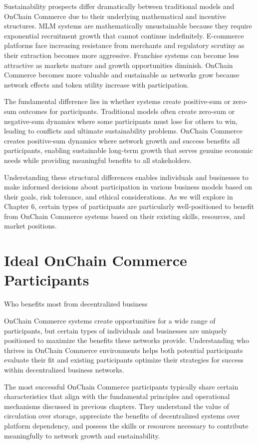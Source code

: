 \documentclass[
  Letterpaper,
]{scrbook}
\begin{document}
Sustainability prospects differ dramatically between traditional models
and OnChain Commerce due to their underlying mathematical and incentive
structures. MLM systems are mathematically unsustainable because they
require exponential recruitment growth that cannot continue
indefinitely. E-commerce platforms face increasing resistance from
merchants and regulatory scrutiny as their extraction becomes more
aggressive. Franchise systems can become less attractive as markets
mature and growth opportunities diminish. OnChain Commerce becomes more
valuable and sustainable as networks grow because network effects and
token utility increase with participation.

The fundamental difference lies in whether systems create positive-sum
or zero-sum outcomes for participants. Traditional models often create
zero-sum or negative-sum dynamics where some participants must lose for
others to win, leading to conflicts and ultimate sustainability
problems. OnChain Commerce creates positive-sum dynamics where network
growth and success benefits all participants, enabling sustainable
long-term growth that serves genuine economic needs while providing
meaningful benefits to all stakeholders.

Understanding these structural differences enables individuals and
businesses to make informed decisions about participation in various
business models based on their goals, risk tolerance, and ethical
considerations. As we will explore in Chapter 6, certain types of
participants are particularly well-positioned to benefit from OnChain
Commerce systems based on their existing skills, resources, and market
positions.

\chapter{Ideal OnChain Commerce
Participants}\label{sec-ideal-participants}

Who benefits most from decentralized business

OnChain Commerce systems create opportunities for a wide range of
participants, but certain types of individuals and businesses are
uniquely positioned to maximize the benefits these networks provide.
Understanding who thrives in OnChain Commerce environments helps both
potential participants evaluate their fit and existing participants
optimize their strategies for success within decentralized business
networks.

The most successful OnChain Commerce participants typically share
certain characteristics that align with the fundamental principles and
operational mechanisms discussed in previous chapters. They understand
the value of circulation over storage, appreciate the benefits of
decentralized systems over platform dependency, and possess the skills
or resources necessary to contribute meaningfully to network growth and
sustainability.
\end{document}
